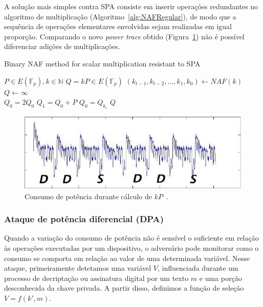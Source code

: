 \documentclass{SBCbookchapter}
\begin{document}
A solu\c{c}\~{a}o mais simples contra SPA consiste em inserir opera\c{c}\~{o}es redundantes no algoritmo de multiplica\c{c}\~{a}o (Algoritmo~\ref{alg:NAFRegular}), de modo que a seq{u}\^{e}ncia de opera\c{c}\~{o}es elementares envolvidas sejam realizadas em igual propor\c{c}\~{a}o. Comparando o novo \textit{power trace} obtido (Figura~\ref{fig:Fig7}) n\~{a}o \'{e} poss\'{i}vel diferenciar adi\c{c}\~{o}es de multiplica\c{c}\~{o}es.

\begin{algorithm}[H]
\caption{Binary NAF method for scalar multiplication resistant to SPA}
\begin{algorithmic}[1]
    \REQUIRE $P \in E(\mathbb{F}_p), k \in \mathbb{N}$
    \ENSURE $Q = kP \in E(\mathbb{F}_p)$
    \STATE $(k_{t-1}, k_{t-2}, ..., k_{1}, k_{0}) \leftarrow NAF(k)$
    \STATE $Q \leftarrow \infty$\\
        \STATE $Q_{0} = 2Q_{0}$
        \STATE $Q_{1} = Q_{0} + P$
        \STATE $Q_{0} = Q_{k_{i}}$
    \ENDFOR
    \RETURN $Q$
    \end{algorithmic}
\label{alg:NAFRegular}
\end{algorithm}

\begin{figure}[ht]
	\centering
	\includegraphics[width=.8\textwidth]{figures/spa2.jpg}
	\caption{Consumo de pot\^{e}ncia durante c\'{a}lculo de $kP$~\cite{ECCBook_HankersonVanstone2004}.}
	\label{fig:Fig7}
\end{figure}

\subsubsection{Ataque de potência diferencial (DPA)}
Quando a varia\c{c}\~{a}o do consumo de pot\^{e}ncia n\~{a}o \'{e} sens\'{i}vel o suficiente em rela\c{c}\~{a}o às opera\c{c}\~{o}es executadas por um dispositivo, o advers\'{a}rio pode monitorar como o consumo se comporta em rela\c{c}\~{a}o ao valor de uma determinada vari\'{a}vel. Nesse ataque, primeiramente detetamos uma vari\'{a}vel $V$, influenciada durante um processo de decripta\c{c}\~{a}o ou assinatura digital por um texto $m$ e uma por\c{c}\~{a}o desconhecida  da chave privada. A partir disso, definimos a fun\c{c}\~{a}o de sele\c{c}\~{a}o $V = f(k',m)$.
\end{document}
